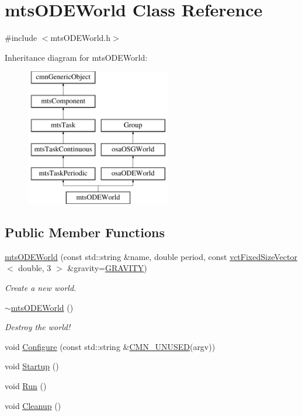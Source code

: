 \hypertarget{classmts_o_d_e_world}{}\section{mts\+O\+D\+E\+World Class Reference}
\label{classmts_o_d_e_world}


{\ttfamily \#include $<$mts\+O\+D\+E\+World.\+h$>$}

Inheritance diagram for mts\+O\+D\+E\+World\+:\begin{figure}[H]
\begin{center}
\leavevmode
\includegraphics[height=6.000000cm]{da/d87/classmts_o_d_e_world}
\end{center}
\end{figure}
\subsection*{Public Member Functions}
\begin{DoxyCompactItemize}
\item 
\hyperlink{classmts_o_d_e_world_ad49af19a2073e37869cd814f49ef18de}{mts\+O\+D\+E\+World} (const std\+::string \&name, double period, const \hyperlink{classvct_fixed_size_vector}{vct\+Fixed\+Size\+Vector}$<$ double, 3 $>$ \&gravity=\hyperlink{classosa_o_d_e_world_ae1d291977a1d6305cea26a6bd87fa320}{G\+R\+A\+V\+I\+T\+Y})
\begin{DoxyCompactList}\small\item\em Create a new world. \end{DoxyCompactList}\item 
\hyperlink{classmts_o_d_e_world_a0258d0476537a288b9c8e1338c6ed308}{$\sim$mts\+O\+D\+E\+World} ()
\begin{DoxyCompactList}\small\item\em Destroy the world! \end{DoxyCompactList}\item 
void \hyperlink{classmts_o_d_e_world_a5dc51ea0cb5cfb120a9edbf67d2f0fa7}{Configure} (const std\+::string \&\hyperlink{cmn_portability_8h_a021894e2626935fa2305434b1e893ff6}{C\+M\+N\+\_\+\+U\+N\+U\+S\+E\+D}(argv))
\item 
void \hyperlink{classmts_o_d_e_world_aad2cbd02cb84d5bce6b9f04488d64b85}{Startup} ()
\item 
void \hyperlink{classmts_o_d_e_world_a9a5287b71830a7c814642c7c23448412}{Run} ()
\item 
void \hyperlink{classmts_o_d_e_world_a550824ddd1a7f7ade6f7d18b5b66b931}{Cleanup} ()
\end{DoxyCompactItemize}
